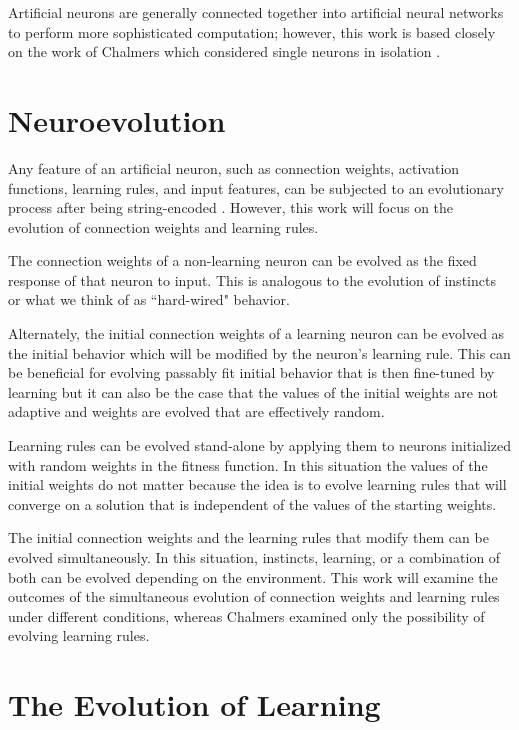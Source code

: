 \documentclass[master]{outhesis}
\begin{document}
Artificial neurons are generally connected together into artificial neural networks to perform more sophisticated computation;
however, this work is based closely on the work of Chalmers which considered single neurons in isolation \cite{chalmers-evolution-learning}.

\section{Neuroevolution}

Any feature of an artificial neuron, such as connection weights, activation functions, learning rules, and input features, can be subjected to an evolutionary process after being string-encoded \cite{Yao:1999lp}.
However, this work will focus on the evolution of connection weights and learning rules.

The connection weights of a non-learning neuron can be evolved as the fixed response of that neuron to input.
This is analogous to the evolution of instincts or what we think of as ``hard-wired" behavior.

Alternately, the initial connection weights of a learning neuron can be evolved as the initial behavior which will be modified by the neuron's learning rule.
This can be beneficial for evolving passably fit initial behavior that is then fine-tuned by learning
but it can also be the case that the values of the initial weights are not adaptive and weights are evolved that are effectively random.

Learning rules can be evolved stand-alone by applying them to neurons initialized with random weights in the fitness function.
In this situation the values of the initial weights do not matter because the idea is to evolve learning rules that will converge on a solution that is independent of the values of the starting weights.

The initial connection weights and the learning rules that modify them can be evolved simultaneously.
In this situation, instincts, learning, or a combination of both can be evolved depending on the environment.
This work will examine the outcomes of the simultaneous evolution of connection weights and learning rules under different conditions,
whereas Chalmers examined only the possibility of evolving learning rules.

\section{The Evolution of Learning}
\end{document}

